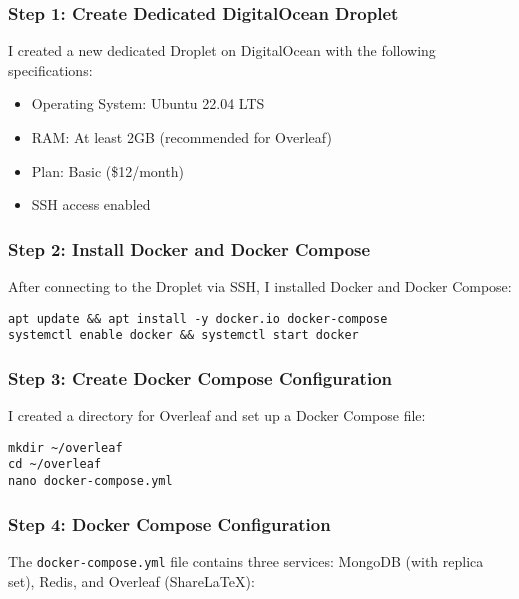 \subsubsection{Step 1: Create Dedicated DigitalOcean Droplet}
I created a new dedicated Droplet on DigitalOcean with the following specifications:
\begin{itemize}
    \item Operating System: Ubuntu 22.04 LTS
    \item RAM: At least 2GB (recommended for Overleaf)
    \item Plan: Basic (\$12/month)
    \item SSH access enabled
\end{itemize}

\subsubsection{Step 2: Install Docker and Docker Compose}
After connecting to the Droplet via SSH, I installed Docker and Docker Compose:
\begin{verbatim}
apt update && apt install -y docker.io docker-compose
systemctl enable docker && systemctl start docker
\end{verbatim}

\subsubsection{Step 3: Create Docker Compose Configuration}
I created a directory for Overleaf and set up a Docker Compose file:
\begin{verbatim}
mkdir ~/overleaf
cd ~/overleaf
nano docker-compose.yml
\end{verbatim}

\subsubsection{Step 4: Docker Compose Configuration}
The \texttt{docker-compose.yml} file contains three services: MongoDB (with replica set), Redis, and Overleaf (ShareLaTeX):

